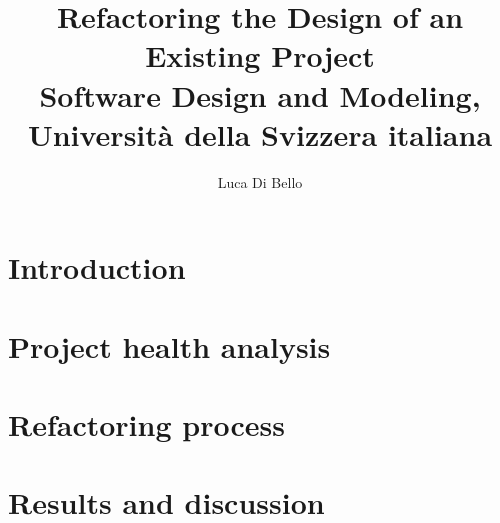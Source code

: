 \documentclass[a4paper, 11pt]{article}
\title{Refactoring the Design of an Existing Project \\\large Software Design and Modeling, Università della Svizzera italiana}
\author{Luca Di Bello}
\date{\displaydate{today}}
\begin{document}
\maketitle

\section{Introduction}


\section{Project health analysis}
\label{sec:project_health_analysis}


\section{Refactoring process}
\label{sec:refactoring}


\section{Results and discussion}
\label{sec:results_conclusions}

\end{document}
